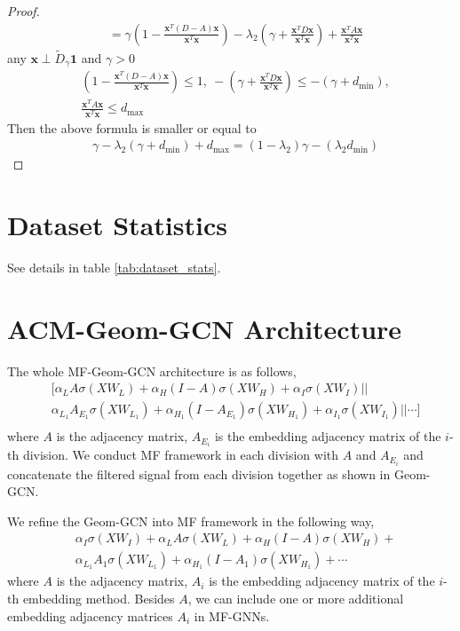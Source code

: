 \documentclass{article}
\newcommand{\0}{{\boldsymbol{0}}}
\newcommand{\6}{{\partial}}
\newcommand{\8}{{\infty}}
\newcommand{\4}{{\nabla}}
\begin{document}
\begin{proof}
\begin{align*}
    & = \gamma (1- \frac{\bm{x}^T (D-A) \bm{x}}{\bm{x}^T \bm{x}}) - \lambda_2(\gamma + \frac{\bm{x}^T D \bm{x}}{\bm{x}^T \bm{x}}) + \frac{\bm{x}^T A \bm{x}}{\bm{x}^T \bm{x}}
\end{align*}
any $\bm{x} \perp  \tilde{D}_\gamma \bm{1}$ and $\gamma >0$
\begin{align*}
& (1- \frac{\bm{x}^T (D-A) \bm{x}}{\bm{x}^T \bm{x}}) \leq 1, \ -(\gamma + \frac{\bm{x}^T D \bm{x}}{\bm{x}^T \bm{x}}) \leq -(\gamma + d_{\text{min}}),\\
    & \frac{\bm{x}^T A \bm{x}}{\bm{x}^T \bm{x}} \leq d_{\max}
\end{align*}
Then the above formula is smaller or equal to
\begin{align*}
    & \gamma  -\lambda_2(\gamma + d_{\text{min}}) + d_{\max} = (1-\lambda_2)\gamma -(\lambda_2 d_{\min})
\end{align*}
\fi
\end{proof}


\section{Dataset Statistics}
See details in table \ref{tab:dataset_stats}.
\label{appendix:dataset_stats}

\section{ACM-Geom-GCN Architecture}
\label{appendix:mfgeomgcn}
The whole MF-Geom-GCN architecture is as follows,
\begin{align*}
& [\alpha_{L} A\sigma(XW_{L})+\alpha_{H} (I-A)\sigma(XW_{H})+\alpha_{I} \sigma(XW_{I}) ||\\
    &\alpha_{L_1} A_{E_1}\sigma(XW_{L_1})+\alpha_{H_1} (I-A_{E_1})\sigma(XW_{H_1})+\alpha_{I_1} \sigma(XW_{I_1}) ||\cdots ]\\
\end{align*}
where $A$ is the adjacency matrix, $A_{E_i}$ is the embedding adjacency matrix of the $i$-th division.
We conduct MF framework in each division with $A$ and $A_{E_i}$ and concatenate the filtered signal from each division together as shown in Geom-GCN.

We refine the Geom-GCN into MF framework in the following way,
\begin{align*}
 &\alpha_{I} \sigma(XW_{I}) + \alpha_{L} A\sigma(XW_{L})+\alpha_{H} (I-A)\sigma(XW_{H})+ \\
 &\alpha_{L_1} A_{1}\sigma(XW_{L_1})+\alpha_{H_1}(I-A_{1})\sigma(XW_{H_1})+ \cdots 
\end{align*}
where $A$ is the adjacency matrix, $A_{i}$ is the embedding adjacency matrix of the $i$-th embedding method. Besides $A$, we can include one or more additional embedding adjacency matrices $A_i$ in MF-GNNs.
\end{document}
